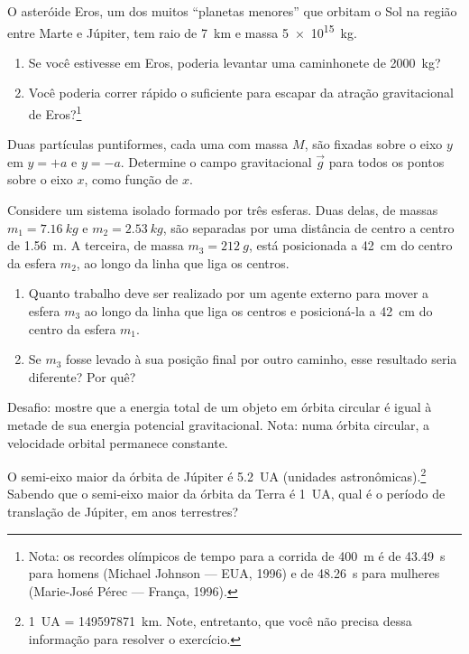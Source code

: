 \documentclass[a4paper]{article}
\begin{document}
\begin{exercicio}
 O asteróide Eros, um dos muitos ``planetas menores'' que orbitam o Sol na região entre Marte e Júpiter, tem raio de \SI{7}{km} e massa \SI{5e15}{kg}.
\begin{enumerate}
\item Se você estivesse em Eros, poderia levantar uma caminhonete de \SI{2000}{kg}?
\item Você poderia correr rápido o suficiente para escapar da atração gravitacional de Eros?\footnote{Nota: os recordes olímpicos de tempo para a corrida de \SI{400}{m} é de \SI{43.49}{s} para homens (Michael Johnson --- EUA, 1996) e de \SI{48.26}{s} para mulheres (Marie-José Pérec --- França, 1996).}
\end{enumerate}
\end{exercicio}

\begin{exercicio}
 Duas partículas puntiformes, cada uma com massa $M$, são fixadas sobre o eixo $y$ em $y=+a$ e $y=-a$.
Determine o campo gravitacional $\vec g$ para todos os pontos sobre o eixo $x$, como função de $x$.
\end{exercicio}

\begin{exercicio}
 Considere um sistema isolado formado por três esferas. Duas delas, de massas $m_1 = \SI{7.16}{kg}$ e $m_2 = \SI{2.53}{kg}$, são separadas por uma distância de centro a centro de \SI{1.56}{m}. A terceira, de massa $m_3 = \SI{212}{g}$, está posicionada a \SI{42}{cm} do centro da esfera $m_2$, ao longo da linha que liga os centros.
\begin{enumerate}
\item Quanto trabalho deve ser realizado por um agente externo para mover a esfera $m_3$ ao longo da linha que liga os centros e posicioná-la a \SI{42}{cm} do centro da esfera $m_1$.
\item Se $m_3$ fosse levado à sua posição final por outro caminho, esse resultado seria diferente? Por quê?
\end{enumerate}
\end{exercicio}

\begin{exercicio}
 Desafio: mostre que a energia total de um objeto em órbita circular é igual à metade de sua energia potencial gravitacional.
Nota: numa órbita circular, a velocidade orbital permanece constante.
\end{exercicio}

\begin{exercicio}
 O semi-eixo maior da órbita de Júpiter é \SI{5.2}{UA} (unidades astronômicas).\footnote{\SI{1}{UA} = \SI{149 597 871}{km}. Note, entretanto, que você não precisa dessa informação para resolver o exercício.}
Sabendo que o semi-eixo maior da órbita da Terra é \SI{1}{UA}, qual é o período de translação de Júpiter, em anos terrestres?
\end{exercicio}
\end{document}
